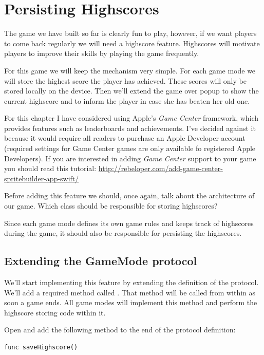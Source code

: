 \chapter{Persisting Highscores}
The game we have built so far is clearly fun to play, however, if we want
players to come back regularly we will need a highscore feature. Highscores will
motivate players to improve their skills by playing the game frequently.

For this game we will keep the mechanism very simple. For each game mode we will
store the highest score the player has achieved. These scores will only be
stored locally on the device. Then we'll extend the game over popup to show the
current highscore and to inform the player in case she has beaten her old one.

\begin{details}
For this chapter I have considered using Apple's \textit{Game Center} framework,
which provides features such as leaderboards and achievements. I've decided
against it because it would require all readers to purchase an Apple Developer
account (required settings for Game Center games are only available fo
registered Apple Developers). If you are interested in adding \textit{Game
Center} support to your game you should read this tutorial:
\url{http://rebeloper.com/add-game-center-spritebuilder-app-swift/}
\end{details}

Before adding this feature we should, once again, talk about the architecture of
our game. Which class should be responsible for storing highscores?

Since each game mode defines its own game rules and keeps track of highscores
during the game, it should also be responsible for persisting the highscores.
 
\section{Extending the GameMode protocol}
We'll start implementing this feature by extending the definition of the
 protocol. We'll add a required method called
. That method will be called from within
 as soon a game ends. All game modes will implement this
method and perform the highscore storing code within it.

\begin{leftbar}
Open  and add the following method to the
end of the protocol definition:
\begin{lstlisting}
func saveHighscore()
\end{lstlisting}
\end{leftbar}

